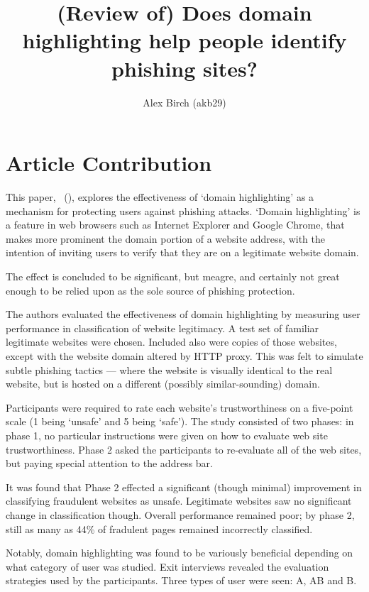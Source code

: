 \documentclass[a4paper,12pt]{article}
\title{(Review of) Does domain highlighting help people identify phishing sites?}
\author{Alex Birch (akb29)}
\newcommand{\citeauthoryear}[1]{%
 \citeauthor{#1}%
 ~(\citeyear{#1})}
\begin{document}
\maketitle

\section{Article Contribution}
This paper, \citeauthoryear{Lin:2011:DHH:1978942.1979244}, explores the effectiveness of `domain highlighting' as a mechanism for protecting users against phishing attacks. `Domain highlighting' is a feature in web browsers such as Internet Explorer and Google Chrome, that makes more prominent the domain portion of a website address, with the intention of inviting users to verify that they are on a legitimate website domain.

The effect is concluded to be significant, but meagre, and certainly not great enough to be relied upon as the sole source of phishing protection.

The authors evaluated the effectiveness of domain highlighting by measuring user performance in classification of website legitimacy. A test set of familiar legitimate websites were chosen. Included also were copies of those websites, except with the website domain altered by HTTP proxy. This was felt to simulate subtle phishing tactics --- where the website is visually identical to the real website, but is hosted on a different (possibly similar-sounding) domain.

Participants were required to rate each website's trustworthiness on a five-point scale (1 being `unsafe' and 5 being `safe'). The study consisted of two phases: in phase 1, no particular instructions were given on how to evaluate web site trustworthiness. Phase 2 asked the participants to re-evaluate all of the web sites, but paying special attention to the address bar.

It was found that Phase 2 effected a significant (though minimal) improvement in classifying fraudulent websites as unsafe. Legitimate websites saw no significant change in classification though. Overall performance remained poor; by phase 2, still as many as 44\% of fradulent pages remained incorrectly classified.

Notably, domain highlighting was found to be variously beneficial depending on what category of user was studied. Exit interviews revealed the evaluation strategies used by the participants. Three types of user were seen: A, AB and B.
\end{document}
